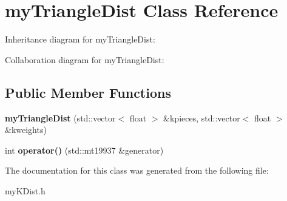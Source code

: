\hypertarget{classmyTriangleDist}{\section{my\+Triangle\+Dist Class Reference}
\label{classmyTriangleDist}
}


Inheritance diagram for my\+Triangle\+Dist\+:


Collaboration diagram for my\+Triangle\+Dist\+:
\subsection*{Public Member Functions}
\begin{DoxyCompactItemize}
\item 
\hypertarget{classmyTriangleDist_a1f5421e3d7c203570b5227adb7c86c87}{{\bfseries my\+Triangle\+Dist} (std\+::vector$<$ float $>$ \&kpieces, std\+::vector$<$ float $>$ \&kweights)}\label{classmyTriangleDist_a1f5421e3d7c203570b5227adb7c86c87}

\item 
\hypertarget{classmyTriangleDist_a338773306213cce1a019499c9eea7646}{int {\bfseries operator()} (std\+::mt19937 \&generator)}\label{classmyTriangleDist_a338773306213cce1a019499c9eea7646}

\end{DoxyCompactItemize}


The documentation for this class was generated from the following file\+:\begin{DoxyCompactItemize}
\item 
my\+K\+Dist.\+h\end{DoxyCompactItemize}

